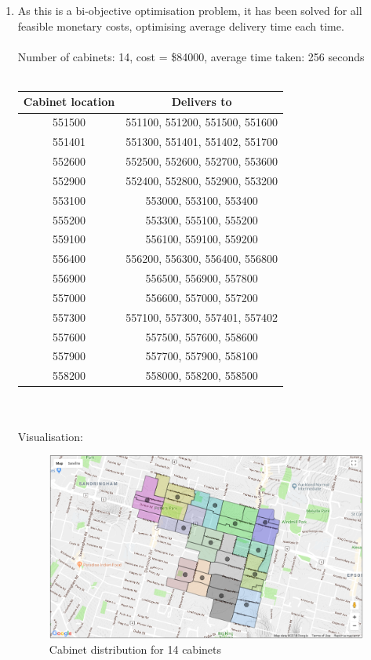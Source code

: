 \documentclass[10pt,a4paper]{article}
\begin{document}
\begin{enumerate}
\item 
As this is a bi-objective optimisation problem, it has been solved for all feasible monetary costs, optimising average delivery time each time.\\ \\
Number of cabinets: 14, cost = \$84000, average time taken: 256 seconds\\ \\
\begin{tabular}{|c|c|}
	\hline 
	Cabinet location & Delivers to \\ 
	\hline 
	551500 & 551100, 551200, 551500, 551600 \\ 
	\hline 
	551401 & 551300, 551401, 551402, 551700 \\ 
	\hline 
	552600 & 552500, 552600, 552700, 553600 \\ 
	\hline 
	552900 & 552400, 552800, 552900, 553200 \\ 
	\hline 
	553100 & 553000, 553100, 553400 \\ 
	\hline 
	555200 & 553300, 555100, 555200 \\ 
	\hline 
	559100 & 556100, 559100, 559200 \\ 
	\hline 
	556400 & 556200, 556300, 556400, 556800 \\ 
	\hline 
	556900 & 556500, 556900, 557800 \\ 
	\hline 
	557000 & 556600, 557000, 557200 \\ 
	\hline 
	557300 & 557100, 557300, 557401, 557402 \\ 
	\hline 
	557600 & 557500, 557600, 558600 \\ 
	\hline 
	557900 & 557700, 557900, 558100 \\ 
	\hline 
	558200 & 558000, 558200, 558500 \\ 
	\hline 
\end{tabular} \\ \\
Visualisation:
\begin{figure}[H]
	\centering
	\includegraphics[width=0.7\linewidth]{14}
	\caption{Cabinet distribution for 14 cabinets}
	\label{fig:14}
\end{figure}



\end{enumerate}
\end{document}
